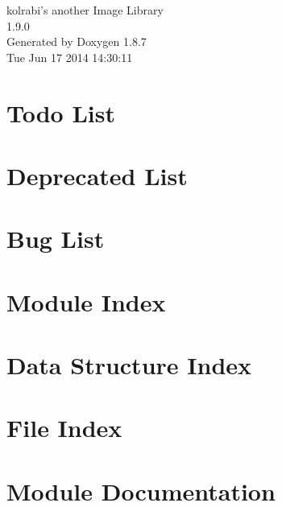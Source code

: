 \documentclass[twoside]{book}
\newcommand{\+}{\discretionary{\mbox{\scriptsize$\hookleftarrow$}}{}{}}
\newcommand{\clearemptydoublepage}{%
  \newpage{\pagestyle{empty}\cleardoublepage}%
}
\begin{document}
\hypersetup{pageanchor=false,
             bookmarks=true,
             bookmarksnumbered=true,
             pdfencoding=unicode
            }
\begin{titlepage}
\vspace*{7cm}
\begin{center}%
{\Large kolrabi's another Image Library \\[1ex]\large 1.\+9.\+0 }\\
\vspace*{1cm}
{\large Generated by Doxygen 1.8.7}\\
\vspace*{0.5cm}
{\small Tue Jun 17 2014 14:30:11}\\
\end{center}
\end{titlepage}
\clearemptydoublepage
\tableofcontents
\clearemptydoublepage
{}
\hypersetup{pageanchor=true}

\chapter{Todo List}
\label{dd/da0/todo}
\hypertarget{dd/da0/todo}{}

\chapter{Deprecated List}
\label{da/d58/deprecated}
\hypertarget{da/d58/deprecated}{}

\chapter{Bug List}
\label{de/da5/bug}
\hypertarget{de/da5/bug}{}

\chapter{Module Index}

\chapter{Data Structure Index}

\chapter{File Index}

\chapter{Module Documentation}



















\end{document}
